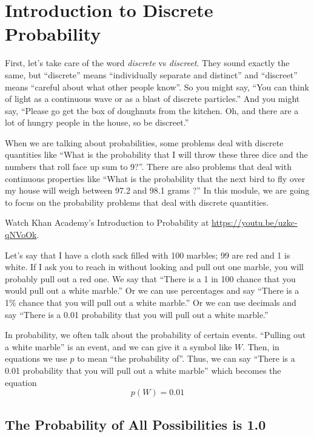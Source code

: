 \chapter{Introduction to Discrete Probability}

First, let's take care of the word \emph{discrete} vs \emph{discreet}.
They sound exactly the same, but ``discrete'' means ``individually
separate and distinct'' and ``discreet'' means ``careful about what
other people know''.  So you might say, ``You can think of light as a
continuous wave or as a blast of discrete particles.'' And you might
say, ``Please go get the box of doughnuts from the kitchen. Oh, and
there are a lot of hungry people in the house, so be
discreet.''

When we are talking about probabilities, some problems deal
with discrete quantities like ``What is the probability that I will
throw these three dice and the numbers that roll face up sum to 9?''. There
are also problems that deal with continuous properties like ``What is
the probability that the next bird to fly over my house will weigh
between 97.2 and 98.1 grams ?'' In this module, we are going to focus
on the probability problems that deal with discrete quantities.

Watch Khan Academy's Introduction to Probability at \url{https://youtu.be/uzkc-qNVoOk}.

Let's say that I have a cloth sack filled with 100 marbles; 99 are red
and 1 is white. If I ask you to reach in without looking and pull out
one marble, you will probably pull out a red one. We say that ``There
is a 1 in 100 chance that you would pull out a white marble.'' Or we
can use percentages and say ``There is a 1\% chance that you will pull
out a white marble.'' Or we can use decimals and say ``There is a 0.01
probability that you will pull out a white marble.''

In probability, we often talk about the probability of certain
events. ``Pulling out a white marble'' is an event, and we can give it
a symbol like $W$. Then, in equations we use $p$ to mean ``the
probability of''.  Thus, we can say ``There is a 0.01 probability that
you will pull out a white marble'' which becomes the equation
\begin{equation*}
  p(W) = 0.01
\end{equation*}

\section{The Probability of All Possibilities is 1.0}

